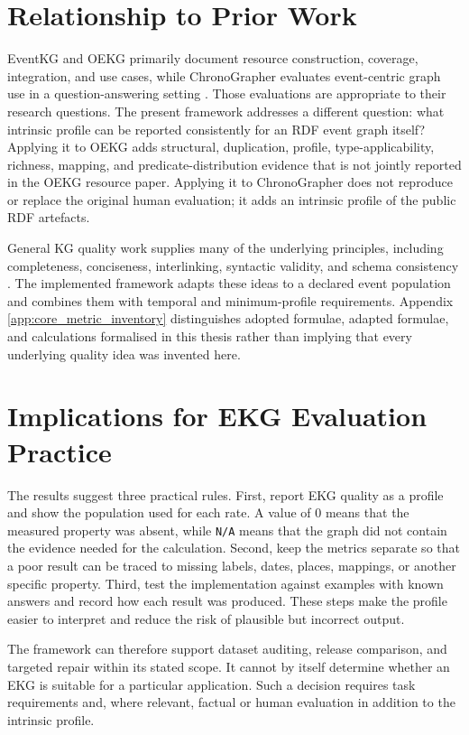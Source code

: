 \section{Relationship to Prior Work}

EventKG and OEKG primarily document resource construction, coverage, integration, and use cases, while ChronoGrapher evaluates event-centric graph use in a question-answering setting \citep{eventkg2018,oekg2023,chronographer2023}. Those evaluations are appropriate to their research questions. The present framework addresses a different question: what intrinsic profile can be reported consistently for an RDF event graph itself? Applying it to OEKG adds structural, duplication, profile, type-applicability, richness, mapping, and predicate-distribution evidence that is not jointly reported in the OEKG resource paper. Applying it to ChronoGrapher does not reproduce or replace the original human evaluation; it adds an intrinsic profile of the public RDF artefacts.

General KG quality work supplies many of the underlying principles, including completeness, conciseness, interlinking, syntactic validity, and schema consistency \citep{zaveri2016,kgquality2021,luzzu2016,testdriven2014}. The implemented framework adapts these ideas to a declared event population and combines them with temporal and minimum-profile requirements. Appendix \ref{app:core_metric_inventory} distinguishes adopted formulae, adapted formulae, and calculations formalised in this thesis rather than implying that every underlying quality idea was invented here.

\section{Implications for EKG Evaluation Practice}

The results suggest three practical rules. First, report EKG quality as a profile and show the population used for each rate. A value of 0 means that the measured property was absent, while \texttt{N/A} means that the graph did not contain the evidence needed for the calculation. Second, keep the metrics separate so that a poor result can be traced to missing labels, dates, places, mappings, or another specific property. Third, test the implementation against examples with known answers and record how each result was produced. These steps make the profile easier to interpret and reduce the risk of plausible but incorrect output.

The framework can therefore support dataset auditing, release comparison, and targeted repair within its stated scope. It cannot by itself determine whether an EKG is suitable for a particular application. Such a decision requires task requirements and, where relevant, factual or human evaluation in addition to the intrinsic profile.

